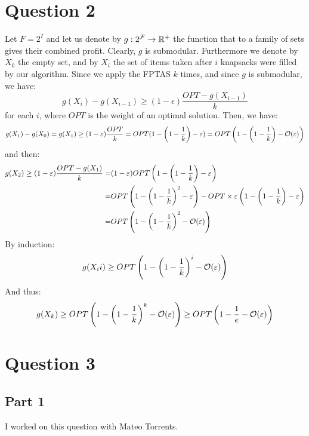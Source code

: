 \documentclass[math, info]{cours}
\begin{document}
\section{Question 2}
Let $F = 2^{I}$ and let us denote by $g: 2^{\mathcal{F}} \to \mathbb{R}^{+}$ the function that to a family of sets gives their combined profit.
Clearly, $g$ is submodular.
Furthermore we denote by $X_{0}$ the empty set, and by $X_{i}$ the set of items taken after $i$ knapsacks were filled by our algorithm.
Since we apply the FPTAS $k$ times, and since $g$ is submodular, we have:
\begin{equation}
  g(X_{i}) - g(X_{i - 1}) \geq (1 - \epsilon)\frac{OPT - g(X_{i - 1})}{k}
	\label{eq:induction}
\end{equation}
for each $i$, where $OPT$ is the weight of an optimal solution.
Then, we have:
\begin{equation}
  g(X_{1}) - g(X_{0}) = g(X_{1}) \geq (1 - \varepsilon)\frac{OPT}{k} = OPT(1 - \left(1 - \frac{1}{k}\right) - \varepsilon) = OPT\left( 1 - \left(1 - \frac{1}{k}\right) - \mathcal{O}(\varepsilon) \right)
	\label{eq:firststep}
\end{equation}
and then:
\begin{equation*}
  \begin{aligned}
    g(X_{2}) \geq (1 - \varepsilon)\frac{OPT - g(X_{1})}{k} =& (1-\varepsilon)OPT\left(1 - \left(1 - \frac{1}{k}\right) - \varepsilon\right)\\
    =& OPT\left( 1 - \left(1 - \frac{1}{k}\right)^{2} - \varepsilon\right) - OPT\times \varepsilon\left(1 - \left(1 - \frac{1}{k}\right) - \varepsilon\right)\\
    =& OPT\left(1 - \left(1 - \frac{1}{k}\right)^{2} - \mathcal{O}(\varepsilon)\right)
  \end{aligned}
\end{equation*}
By induction:
\begin{equation*}
  g(X_{i}i) \geq OPT\left(1 - \left(1 - \frac{1}{k}\right)^{i} - \mathcal{O}(\varepsilon)\right)
\end{equation*}
And thus:
\begin{equation*}
  g(X_{k}) \geq OPT\left(1 - \left(1 - \frac{1}{k}\right)^{k} - \mathcal{O}(\varepsilon)\right) \geq OPT\left(1 - \frac{1}{e} - \mathcal{O}(\varepsilon)\right)
\end{equation*}

\section{Question 3}
\subsection{Part 1}
I worked on this question with Mateo Torrents.
\smallskip
\end{document}
